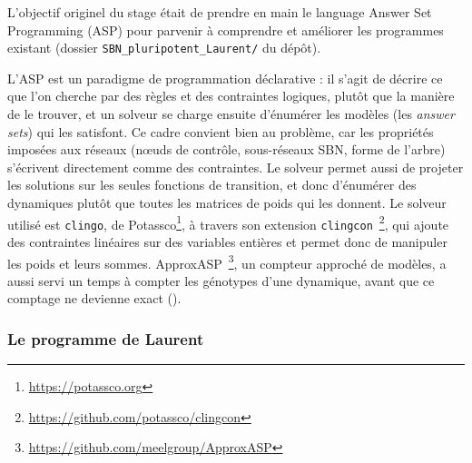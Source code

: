 \documentclass[12pt, a4paper]{article}
\begin{document}
L'objectif originel du stage était de prendre en main le language Answer Set Programming (ASP) pour parvenir à comprendre et améliorer les programmes existant (dossier \texttt{SBN\_pluripotent\_Laurent/} du dépôt).

L'ASP est un paradigme de programmation déclarative : il s'agit de décrire ce que l'on cherche par des règles et des contraintes logiques, plutôt que la manière de le trouver, et un solveur se charge ensuite d'énumérer les modèles (les \emph{answer sets}) qui les satisfont.
Ce cadre convient bien au problème, car les propriétés imposées aux réseaux (nœuds de contrôle, sous-réseaux SBN, forme de l'arbre) s'écrivent directement comme des contraintes.
Le solveur permet aussi de projeter les solutions sur les seules fonctions de transition, et donc d'énumérer des dynamiques plutôt que toutes les matrices de poids qui les donnent.
Le solveur utilisé est \texttt{clingo}, de Potassco\footnote{\url{https://potassco.org}}, à travers son extension \texttt{clingcon}~\cite{banbara2017}\footnote{\url{https://github.com/potassco/clingcon}}, qui ajoute des contraintes linéaires sur des variables entières et permet donc de manipuler les poids et leurs sommes.
ApproxASP~\cite{kabir2022}\footnote{\url{https://github.com/meelgroup/ApproxASP}}, un compteur approché de modèles, a aussi servi un temps à compter les génotypes d'une dynamique, avant que ce comptage ne devienne exact ().

\subsubsection{Le programme de Laurent}
\end{document}
